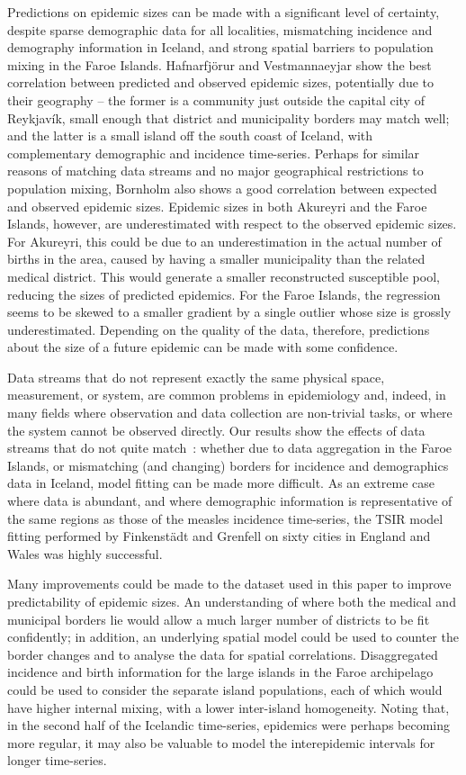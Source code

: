 \documentclass[10pt]{article}
\begin{document}
Predictions on epidemic sizes can be made with a significant level of certainty, despite sparse demographic data for all localities, mismatching incidence and demography information in Iceland, and strong spatial barriers to population mixing in the Faroe Islands. Hafnarfj\"{o}r\dh{}ur and Vestmannaeyjar show the best correlation between predicted and observed epidemic sizes, potentially due to their geography -- the former is a community just outside the capital city of Reykjav\'{i}k, small enough that district and municipality borders may match well; and the latter is a small island off the south coast of Iceland, with complementary demographic and incidence time-series. Perhaps for similar reasons of matching data streams and no major geographical restrictions to population mixing, Bornholm also shows a good correlation between expected and observed epidemic sizes. Epidemic sizes in both Akureyri and the Faroe Islands, however, are underestimated with respect to the observed epidemic sizes. For Akureyri, this could be due to an underestimation in the actual number of births in the area, caused by having a smaller municipality than the related medical district. This would generate a smaller reconstructed susceptible pool, reducing the sizes of predicted epidemics. For the Faroe Islands, the regression seems to be skewed to a smaller gradient by a single outlier whose size is grossly underestimated. Depending on the quality of the data, therefore, predictions about the size of a future epidemic can be made with some confidence. 

Data streams that do not represent exactly the same physical space, measurement, or system, are common problems in epidemiology and, indeed, in many fields where observation and data collection are non-trivial tasks, or where the system cannot be observed directly. Our results show the effects of data streams that do not quite match~: whether due to data aggregation in the Faroe Islands, or mismatching (and changing) borders for incidence and demographics data in Iceland, model fitting can be made more difficult. As an extreme case where data is abundant, and where demographic information is representative of the same regions as those of the measles incidence time-series, the TSIR model fitting performed by Finkenst\"{a}dt and Grenfell \cite{Finkenstadt2000} on sixty cities in England and Wales was highly successful.

Many improvements could be made to the dataset used in this paper to improve predictability of epidemic sizes. An understanding of where both the medical and municipal borders lie would allow a much larger number of districts to be fit confidently; in addition, an underlying spatial model could be used to counter the border changes and to analyse the data for spatial correlations. Disaggregated incidence and birth information for the large islands in the Faroe archipelago could be used to consider the separate island populations, each of which would have higher internal mixing, with a lower inter-island homogeneity. Noting that, in the second half of the Icelandic time-series, epidemics were perhaps becoming more regular, it may also be valuable to model the interepidemic intervals for longer time-series. 
\end{document}
